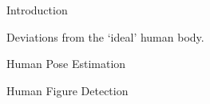 Introduction




















Deviations from the \enquote*{ideal} human body.



Human Pose Estimation 



Human Figure Detection

%
